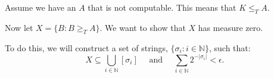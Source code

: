 \documentclass[12pt]{article}
\newcommand{\Nat}{\ensuremath{\mathbb{N}}}
\begin{document}
Assume we have an $A$ that is not computable.  This means that $K \le_T A$.

Now let $X = \{B \colon B \geq_T A \}$.  We want to show that $X$ has measure zero.

To do this, we will construct a set of strings,
$\{\sigma_i \colon i \in \Nat\}$, such that:
\[
	X \subseteq \bigcup_{i \in \Nat} [\sigma_i] \quad \text{ and } \quad \sum_{i \in \Nat} 2^{-|\sigma_i|} < \epsilon.
\]
\end{document}
